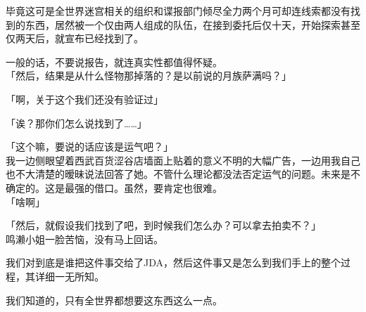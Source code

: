 毕竟这可是全世界迷宫相关的组织和谍报部门倾尽全力两个月可却连线索都没有找到的东西，居然被一个仅由两人组成的队伍，在接到委托后仅十天，开始探索甚至仅两天后，就宣布已经找到了。

一般的话，不要说报告，就连真实性都值得怀疑。\\

「然后，结果是从什么怪物那掉落的？是以前说的月族萨满吗？」

「啊，关于这个我们还没有验证过」

「诶？那你们怎么说找到了……」

「这个嘛，要说的话应该是运气吧？」\\

我一边侧眼望着西武百货涩谷店墙面上贴着的意义不明的大幅广告，一边用我自己也不大清楚的暧昧说法回答了她。不管什么理论都没法否定运气的问题。未来是不确定的。这是最强的借口。虽然，要肯定也很难。\\

「啥啊」

「然后，就假设我们找到了吧，到时候我们怎么办？可以拿去拍卖不？」\\

鸣濑小姐一脸苦恼，没有马上回话。

我们对到底是谁把这件事交给了JDA，然后这件事又是怎么到我们手上的整个过程，其详细一无所知。

我们知道的，只有全世界都想要这东西这么一点。\\

